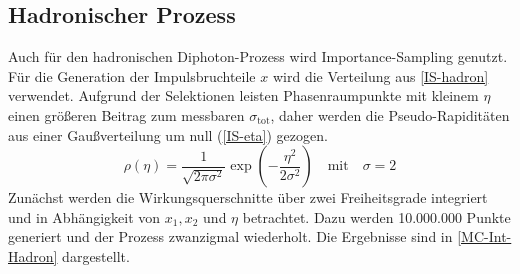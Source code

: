 \subsection{Hadronischer Prozess}
Auch für den hadronischen Diphoton-Prozess wird Importance-Sampling genutzt. Für die Generation der Impulsbruchteile $x$ wird die Verteilung aus \textsf{\autoref{IS-hadron}} verwendet. Aufgrund der Selektionen leisten Phasenraumpunkte mit kleinem $\eta$ einen größeren Beitrag zum messbaren $\sigma_{\text{tot}}$, daher werden die Pseudo-Rapiditäten aus einer Gaußverteilung um null (\textsf{\autoref{IS-eta}}) gezogen.
\begin{equation}
\rho(\eta) = \frac{1}{\sqrt{2\pi \sigma^2}} \exp(-\frac{\eta^2}{2\sigma^2}) \quad \text{mit} \quad \sigma=2
\label{IS-eta}
\end{equation}
Zunächst werden die Wirkungsquerschnitte über zwei Freiheitsgrade integriert und in Abhängigkeit von $x_1, x_2$ und $\eta$ betrachtet. Dazu werden 10.000.000 Punkte generiert und der Prozess zwanzigmal wiederholt. Die Ergebnisse sind in \textsf{\autoref{MC-Int-Hadron}} dargestellt.
